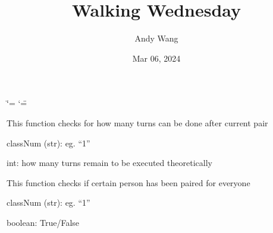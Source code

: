 \documentclass[letterpaper,10pt,english]{sphinxmanual}
\title{Walking Wednesday}
\date{Mar 06, 2024}
\author{Andy Wang}
\begin{document}
\ifdefined\shorthandoff
  \ifnum\catcode`\=\string=\active\shorthandoff{=}\fi
  \ifnum\catcode`\"=\active{}\fi
\fi

\pagestyle{empty}
\sphinxmaketitle
\pagestyle{plain}
\sphinxtableofcontents
\pagestyle{normal}
\label{\detokenize{index::doc}}


\sphinxstepscope
{}\label{\detokenize{countDown:module-countDown}}

\begin{fulllineitems}
\label{\detokenize{countDown:countDown.changeCountdownNumber}}
\pysigstartsignatures
{}
\pysigstopsignatures
\sphinxAtStartPar
This function checks for how many turns can be done after current pair
\begin{description}
\sphinxAtStartPar
classNum (str): eg. “1”

\sphinxAtStartPar
int: how many turns remain to be executed theoretically

\end{description}

\end{fulllineitems}


\begin{fulllineitems}
\label{\detokenize{countDown:countDown.checkAllPaired}}
\pysigstartsignatures
{}
\pysigstopsignatures
\sphinxAtStartPar
This function checks if certain person has been paired for everyone
\begin{description}
\sphinxAtStartPar
classNum (str): eg. “1”

\sphinxAtStartPar
boolean: True/False

\end{description}

\end{fulllineitems}
\end{document}
